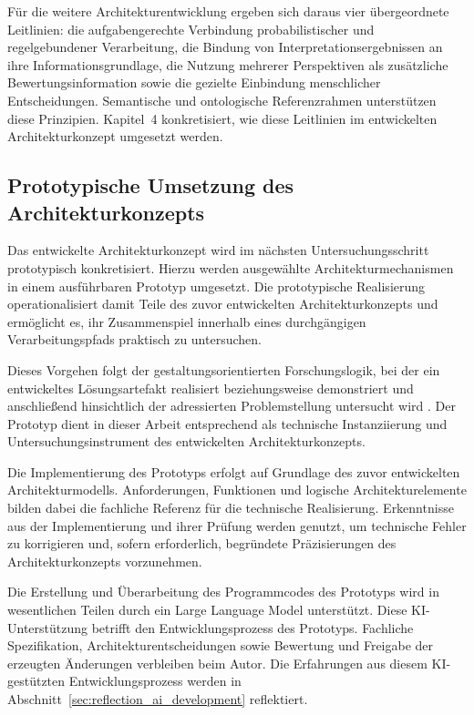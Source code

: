Für die weitere Architekturentwicklung ergeben sich daraus vier
übergeordnete Leitlinien: die aufgabengerechte Verbindung probabilistischer
und regelgebundener Verarbeitung, die Bindung von Interpretationsergebnissen
an ihre Informationsgrundlage, die Nutzung mehrerer Perspektiven als
zusätzliche Bewertungsinformation sowie die gezielte Einbindung menschlicher
Entscheidungen. Semantische und ontologische Referenzrahmen unterstützen diese
Prinzipien. Kapitel~4 konkretisiert, wie diese Leitlinien im entwickelten
Architekturkonzept umgesetzt werden.

\subsection{Prototypische Umsetzung des Architekturkonzepts}
\label{sec:prototypische_untersuchung}

Das entwickelte Architekturkonzept wird im nächsten Untersuchungsschritt
prototypisch konkretisiert. Hierzu werden ausgewählte Architekturmechanismen
in einem ausführbaren Prototyp umgesetzt. Die prototypische Realisierung
operationalisiert damit Teile des zuvor entwickelten Architekturkonzepts und
ermöglicht es, ihr Zusammenspiel innerhalb eines durchgängigen
Verarbeitungspfads praktisch zu untersuchen.

Dieses Vorgehen folgt der gestaltungsorientierten Forschungslogik, bei der ein
entwickeltes Lösungsartefakt realisiert beziehungsweise demonstriert und
anschließend hinsichtlich der adressierten Problemstellung untersucht wird
\cite{Wieringa2014,Peffers2007}. Der Prototyp dient in dieser Arbeit
entsprechend als technische Instanziierung und Untersuchungsinstrument des
entwickelten Architekturkonzepts.

Die Implementierung des Prototyps erfolgt auf Grundlage des zuvor entwickelten
Architekturmodells. Anforderungen, Funktionen und logische
Architekturelemente bilden dabei die fachliche Referenz für die technische
Realisierung. Erkenntnisse aus der Implementierung und ihrer Prüfung werden
genutzt, um technische Fehler zu korrigieren und, sofern erforderlich,
begründete Präzisierungen des Architekturkonzepts vorzunehmen.

Die Erstellung und Überarbeitung des Programmcodes des Prototyps wird in
wesentlichen Teilen durch ein Large Language Model unterstützt. Diese
KI-Unterstützung betrifft den Entwicklungsprozess des Prototyps. Fachliche
Spezifikation, Architekturentscheidungen sowie Bewertung und Freigabe der
erzeugten Änderungen verbleiben beim Autor. Die Erfahrungen aus diesem
KI-gestützten Entwicklungsprozess werden in
Abschnitt~\ref{sec:reflection_ai_development} reflektiert.

